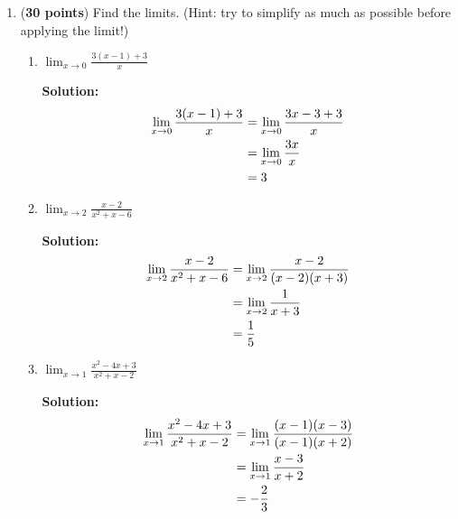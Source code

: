 \documentclass[a4paper]{article}
\begin{document}
\begin{enumerate}
\begin{enumerate}
\end{enumerate}


\item (\textbf{30 points}) Find the limits. (Hint: try to simplify as much as possible before applying the limit!)

\begin{enumerate}
	\item $\lim_{x \to 0} \frac{3(x-1)+3}{x}$
	
	\textbf{Solution:}\\
		
	\begin{align*}
	\lim_{x \to 0} \frac{3(x-1)+3}{x} &= \lim_{x \to 0} \frac{3x-3+3}{x}\notag\\
	&= \lim_{x \to 0} \frac{3x}{x}\notag\\
	&= 3\notag
	\end{align*}	

	\item $\lim_{x \to 2} \frac{x-2}{x^2+x-6}$
	
	\textbf{Solution:}\\
	
	\begin{align*}
	\lim_{x \to 2} \frac{x-2}{x^2+x-6} &= \lim_{x \to 2} \frac{x-2}{(x-2)(x+3)}\notag\\
	&= \lim_{x \to 2} \frac{1}{x+3}\notag\\
	&= \frac{1}{5}\notag
	\end{align*}	
	
	
	\item $\lim_{x \to 1} \frac{x^2-4x+3}{x^2+x-2}$
	
	\textbf{Solution:}\\
	
	\begin{align*}
	\lim_{x \to 1} \frac{x^2-4x+3}{x^2+x-2} &= \lim_{x \to 1} \frac{(x-1)(x-3)}{(x-1)(x+2)}\notag\\
	&= \lim_{x \to 1} \frac{x-3}{x+2}\notag\\
	&= -\frac{2}{3}\notag
	\end{align*}

	
\end{enumerate}


\end{enumerate}
\end{document}
